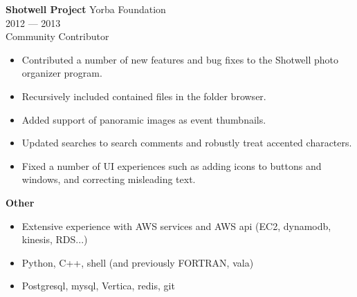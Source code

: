 \myfontsize{\bigheader}
\textbf{Shotwell Project}
\myfontsize{\bodysize}
Yorba Foundation\\
2012 --- 2013\\
Community Contributor\\
\begin{itemize}[topsep=1ex, partopsep=0ex, parsep=0ex, itemsep=0.5ex]
    \item Contributed a number of new features and bug fixes to the Shotwell photo organizer program.
    \item Recursively included contained files in the folder browser.
    \item Added support of panoramic images as event thumbnails.
    \item Updated searches to search comments and robustly treat accented characters.
    \item Fixed a number of UI experiences such as adding icons to buttons and windows, and correcting misleading text.
\end{itemize}


\vspace{\mybigskip}
\myfontsize{\littleheader}
\textbf{Other}\\
\myfontsize{\bodysize}
\begin{itemize}[topsep=1ex, partopsep=0ex, parsep=0ex, itemsep=0.5ex]
    \item Extensive experience with AWS services and AWS api (EC2, dynamodb, kinesis, RDS...)
    \item Python, C++, shell (and previously FORTRAN, vala)
    \item Postgresql, mysql, Vertica, redis, git
\end{itemize}

